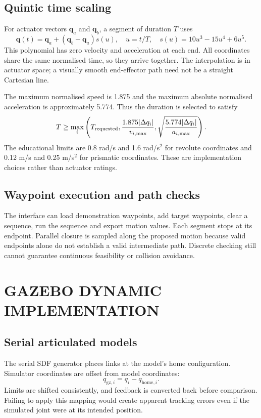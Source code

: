 \documentclass[11pt,a4paper,oneside]{report}
\begin{document}
\section{Quintic time scaling}
For actuator vectors $\mathbf q_a$ and $\mathbf q_b$, a segment of duration $T$ uses
\begin{equation}
\mathbf q(t)=\mathbf q_a+(\mathbf q_b-\mathbf q_a)s(u),\quad u=t/T,\quad s(u)=10u^3-15u^4+6u^5.
\end{equation}
This polynomial has zero velocity and acceleration at each end. All coordinates share the same normalised time, so they arrive together. The interpolation is in actuator space; a visually smooth end-effector path need not be a straight Cartesian line.

The maximum normalised speed is 1.875 and the maximum absolute normalised acceleration is approximately 5.774. Thus the duration is selected to satisfy
\begin{equation}
T\ge\max_i\left(T_{\rm requested},\frac{1.875|\Delta q_i|}{v_{i,\max}},\sqrt{\frac{5.774|\Delta q_i|}{a_{i,\max}}}\right).
\end{equation}
The educational limits are 0.8 rad/s and 1.6 rad/s$^2$ for revolute coordinates and 0.12 m/s and 0.25 m/s$^2$ for prismatic coordinates. These are implementation choices rather than actuator ratings.

\section{Waypoint execution and path checks}
The interface can load demonstration waypoints, add target waypoints, clear a sequence, run the sequence and export motion values. Each segment stops at its endpoint. Parallel closure is sampled along the proposed motion because valid endpoints alone do not establish a valid intermediate path. Discrete checking still cannot guarantee continuous feasibility or collision avoidance.



\chapter{GAZEBO DYNAMIC IMPLEMENTATION}
\section{Serial articulated models}
The serial SDF generator places links at the model's home configuration. Simulator coordinates are offset from model coordinates:
\begin{equation}
q_{\mathrm{gz},i}=q_i-q_{\mathrm{home},i}.
\end{equation}
Limits are shifted consistently, and feedback is converted back before comparison. Failing to apply this mapping would create apparent tracking errors even if the simulated joint were at its intended position.
\end{document}

